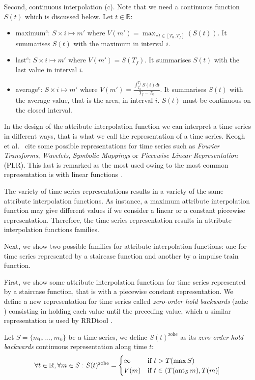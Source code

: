 Second, continuous interpolation (c). Note that we need a continuous
function $S(t)$ which is discussed below. Let $t\in\mathbb{R}$:
\begin{itemize}
\item maximum$^c$: $S \times i \mapsto m'$ where $V(m') = \max_{\forall t
    \in [T_0,T_f]}(S(t))$. It summarises $S(t)$ with the maximum in
  interval $i$.
\item last$^c$: $S \times i \mapsto m'$ where $V(m') = S(T_f)$. It
  summarises $S(t)$ with the last value in interval $i$.
\item average$^c$: $S \times i \mapsto m'$ where $V(m') =
  \frac{\int_{T_0}^{T_f} S(t)dt}{T_f-T_0}$. It summarises $S(t)$ with
  the average value, that is the area, in interval $i$. $S(t)$ must be
  continuous on the closed interval.
\end{itemize}


In the design of the attribute interpolation function we can interpret
a time series in different ways, that is what we call the
representation of a time series. Keogh et al.\ \cite{last:keogh} cite
some possible representations for time series such as \emph{Fourier
  Transforms}, \emph{Wavelets}, \emph{Symbolic Mappings} or
\emph{Piecewise Linear Representation} (PLR). This last is remarked as
the most used owing to the most common representation is with linear
functions \cite{keogh01}.

The variety of time series representations results in a variety of the
same attribute interpolation functions. As instance, a maximum
attribute interpolation function may give different values if we
consider a linear or a constant piecewise representation. Therefore,
the time series representation results in attribute interpolation
functions families.


Next, we show two possible families for attribute interpolation
functions: one for time series represented by a staircase function and
another by a impulse train function.

First, we show some attribute interpolation functions for time series
represented by a staircase function, that is with a piecewise constant
representation.  We define a new representation for time series called
\emph{zero-order hold backwards}
(zohe%
) consisting in holding each value until the preceding value, which a
similar representation is used by RRDtool \cite{lisa98:oetiker}.

Let $S=\{m_0,\ldots,m_k\}$ be a time series, we define
$S(t)^{\text{zohe}}$ as its \emph{zero-order hold backwards}
continuous representation along time $t$:
\[
\forall t \in \mathbb{R}  ,\forall m \in S:
S(t)^{\text{zohe}} =  
\begin{cases}
  \infty & \text{if } t > T(\max S) \\%
  V(m) & \text{if }  t\in (T(\prev_S m),T(m)]
\end{cases}
\]


